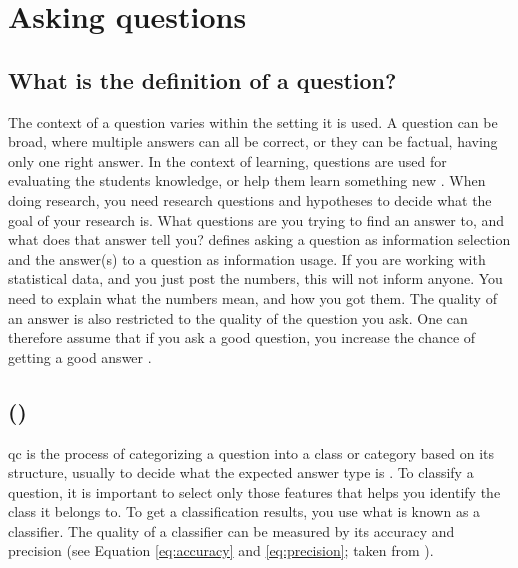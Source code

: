 \section{Asking questions}
\label{sec:asking_questions}

\subsection{What is the definition of a question?}
\label{sec:question_definition}
The context of a question varies within the setting it is used. 
A question can be broad, where multiple answers can all be correct, or they can be factual, having only one right answer. 
In the context of learning, questions are used for evaluating the students knowledge, or help them learn something new \cite{Nielsen2008}.
\vspace{0.5em}\newline
When doing research, you need research questions and hypotheses to decide what the goal of your research is. 
What questions are you trying to find an answer to, and what does that answer tell you?
\textcite{Slowiaczek1992} defines asking a question as information selection and the answer(s) to a question as information usage. 
If you are working with statistical data, and you just post the numbers, this will not inform anyone. 
You need to explain what the numbers mean, and how you got them.
The quality of an answer is also restricted to the quality of the question you ask. 
One can therefore assume that if you ask a good question, you increase the chance of getting a good answer \cite{Slowiaczek1992}. 

\subsection[Question classification]{ ()}
\label{sec:question_classification}
\gls{qc} is the process of categorizing a question into a class or category based on its structure, usually to decide what the expected answer type is \cite{Li, Loni2011, Lopez2011}. 
To classify a question, it is important to select only those features that helps you identify the class it belongs to.
To get a classification results, you use what is known as a classifier. 
The quality of a classifier can be measured by its accuracy and precision (see Equation \ref{eq:accuracy} and \ref{eq:precision}; taken from \cite[p.~13]{Li}).

